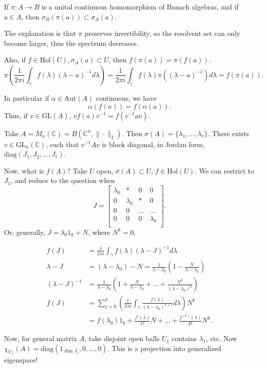 \begin{remark}
	If $\pi: A \to B$ is a unital continuous homomorphism of Banach algebras, and if $a \in A$, then $\sigma_B(\pi(a)) \subset \sigma_A(a)$.

	The explanation is that $\pi$ preserves invertibility, so the resolvent set can only become larger, thus the spectrum decreases.

	Also, if $f \in \text{Hol}(U), \sigma_A(a) \subset U$, then $f(\pi(a)) = \pi(f(a))$.
\[
		\pi\left( \frac{1}{2 \pi i} \int _\gamma f(\lambda) (\lambda - a)^{-1} d \lambda \right) 
		= \frac{1}{2 \pi i} \int _\gamma f(\lambda) \pi\left( (\lambda - a)^{-1} \right) d \lambda
		= f(\pi(a))
	.\]
\end{remark}

In particular if $\alpha \in \text{Aut}(A)$ continuous, we have 
 \[
	\alpha(f(a)) = f(\alpha(a))
.\] 
Thus, if $v \in \text{GL}(A)$, $v f(a) v^{-1} = f(v^{-1} a v)$.

\begin{example}
	Take $A = M_n(\mathbb{C}) = B(\mathbb{C}^n, \|\cdot \|_2)$.
	Then $\sigma(A) = \{\lambda_1, \ldots, \lambda_r\} $. There exists $v \in \text{GL}_n(\mathbb{C})$, such that $v^{-1} A v$ is block diagonal, in Jordan form, $\text{diag}(J_1, J_2, \ldots, J_r)$.

	Now, what is $f(A)$? Take $U$ open, $\sigma(A) \subset U$, $f \in \text{Hol}(U)$. We can restrict to $J_1$, and reduce to the question when
	\[
		J =
		\begin{bmatrix}
			\lambda_0 & * & 0 & 0 \\
			0 & \lambda_0 & * & 0 \\
			0 & 0 & \ldots & \ldots \\
			0 & 0 & 0 & \lambda_0 \\
		\end{bmatrix}
	.\] 
	Or, generally, $J = \lambda_0 1_k + N$, where $N^k = 0$.
	
	\begin{align*}
		f(J)
		&= \frac{1}{2 \pi i}\int _\gamma f(\lambda)(\lambda - J)^{-1} d \lambda \\
		\lambda - J &= (\lambda - \lambda_0) - N = \frac{1}{\lambda - \lambda_0}\left( 1 - \frac{N}{\lambda - \lambda_0} \right)  \\
		(\lambda - J)^{-1} &= \frac{1}{\lambda - \lambda_0} \left( 1 + \frac{N}{\lambda - \lambda_0} + \ldots + \frac{N^k}{(\lambda - \lambda_0)^k} \right) \\
		f(J)
		&= \sum_{j= 0}^k \left( \frac{1}{2 \pi i} \int _\gamma \frac{f(\lambda)}{ (\lambda - \lambda_0)^{k + 1}}d \lambda \right)  N^k \\
		&= f(\lambda_0) 1_k + \frac{f'(\lambda)}{1!} N + \ldots + \frac{f^{(k)}(\lambda)}{k!} N^k 
	.\end{align*}

	Now, for general matrix $A$, take disjoint open balls $U_1$ contains $\lambda_1$, etc. Now $\chi_{U_1}(A) = \text{diag}\left(1_{\operatorname{dim} J_1}, 0, \ldots, 0\right)$. This is a projection into generalized eigenspace!
\end{example}
